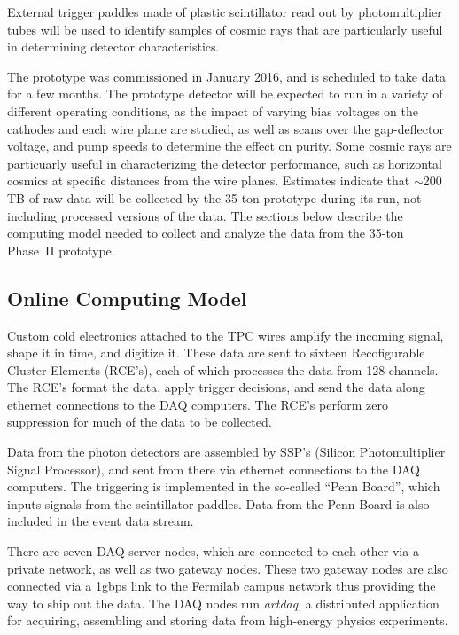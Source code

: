 \noindent
External trigger paddles made of plastic scintillator read out by photomultiplier tubes
will be used to identify samples of cosmic rays that are particularly useful in determining
detector characteristics.

The prototype was commissioned in January 2016,  and is scheduled to take data for a few months.
The prototype detector will be expected to run in a variety of different operating conditions, as
the impact of varying bias voltages on the cathodes and each wire plane are studied, as well as
scans over the gap-deflector voltage, and pump speeds to determine the effect on purity.  Some cosmic
rays are particuarly useful in characterizing the detector performance, such as horizontal cosmics
at specific distances from the wire planes.  Estimates indicate that $\sim$200\,TB of raw data will be collected
by the 35-ton prototype during its run, not including processed versions of the data.
The sections below describe the computing model needed
to collect and analyze the data from the 35-ton Phase~II prototype.

\subsection{Online Computing Model}

Custom cold electronics attached to the TPC wires amplify the incoming signal, shape it in time,
and digitize it.  These data are sent to sixteen Recofigurable Cluster Elements (RCE's), each of which
processes the data from 128 channels.  The RCE's format the data, apply trigger decisions, and send the
data along ethernet connections to the DAQ computers.  The RCE's perform zero suppression for
much of the data to be collected.


Data from the photon detectors are assembled
by SSP's (Silicon Photomultiplier Signal Processor), and sent from there via ethernet connections to the DAQ computers.  The
triggering is implemented in the so-called ``Penn Board'', which inputs signals from the scintillator paddles.  Data
from the Penn Board is also included in the event data stream.

There are seven DAQ server nodes, which are connected to each other via a private network, as well as two gateway nodes. 
These two gateway nodes are also connected via a 1gbps link to the Fermilab campus network thus providing the way
to ship out the data. The DAQ nodes run {\it artdaq}, a distributed application for acquiring, assembling and storing data from high-energy
physics experiments. 

